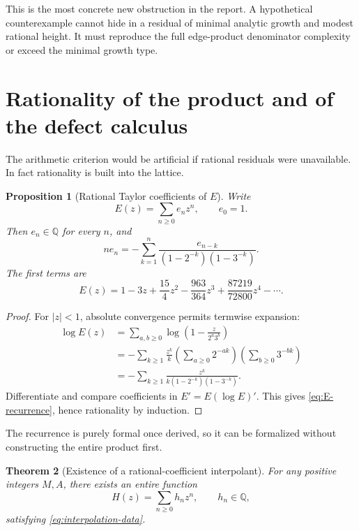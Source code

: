 \documentclass[11pt]{article}
\newtheorem{theorem}{Theorem}[section]
\newtheorem{proposition}[theorem]{Proposition}
\theoremstyle{definition}
\newcommand{\Q}{\mathbb Q}
\begin{document}
This is the most concrete new obstruction in the report.  A hypothetical counterexample cannot hide in a residual of minimal analytic growth and modest rational height.  It must reproduce the full edge-product denominator complexity or exceed the minimal growth type.

\section{Rationality of the product and of the defect calculus}\label{sec:rationality}

The arithmetic criterion would be artificial if rational residuals were unavailable.  In fact rationality is built into the lattice.

\begin{proposition}[Rational Taylor coefficients of \(E\)]\label{prop:E-rational}
Write
\[
  E(z)=\sum_{n\ge0}e_nz^n,
  \qquad e_0=1.
\]
Then \(e_n\in\Q\) for every \(n\), and
\begin{equation}\label{eq:E-recurrence}
  n e_n
   =-\sum_{k=1}^n
    \frac{e_{n-k}}{(1-2^{-k})(1-3^{-k})}.
\end{equation}
The first terms are
\[
  E(z)=1-3z+\frac{15}{4}z^2-\frac{963}{364}z^3
       +\frac{87219}{72800}z^4-\cdots .
\]
\end{proposition}

\begin{proof}
For \(|z|<1\), absolute convergence permits termwise expansion:
\begin{align*}
 \log E(z)
  &=\sum_{a,b\ge0}\log\left(1-\frac{z}{2^a3^b}\right)\\
  &=-\sum_{k\ge1}\frac{z^k}{k}
      \left(\sum_{a\ge0}2^{-ak}\right)
      \left(\sum_{b\ge0}3^{-bk}\right)\\
  &=-\sum_{k\ge1}
     \frac{z^k}{k(1-2^{-k})(1-3^{-k})}.
\end{align*}
Differentiate and compare coefficients in \(E'=E(\log E)'\).  This gives \eqref{eq:E-recurrence}, hence rationality by induction.
\end{proof}

The recurrence is purely formal once derived, so it can be formalized without constructing the entire product first.

\begin{theorem}[Existence of a rational-coefficient interpolant]\label{thm:rational-interpolant}
For any positive integers \(M,A\), there exists an entire function
\[
  H(z)=\sum_{n\ge0}h_nz^n,
  \qquad h_n\in\Q,
\]
satisfying \eqref{eq:interpolation-data}.
\end{theorem}
\end{document}
